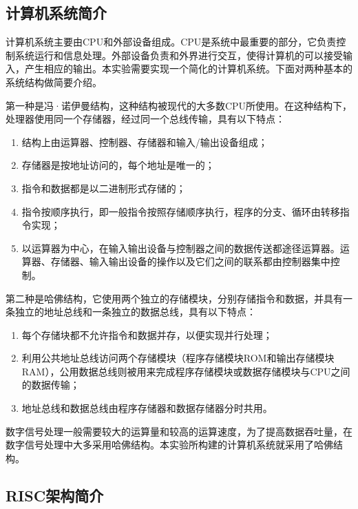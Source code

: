 \documentclass[titlepage, 11pt]{article}
\begin{document}
	\subsection{计算机系统简介}
	计算机系统主要由CPU和外部设备组成。CPU是系统中最重要的部分，它负责控制系统运行和信息处理。外部设备负责和外界进行交互，使得计算机的可以接受输入，产生相应的输出。本实验需要实现一个简化的计算机系统。下面对两种基本的系统结构做简要介绍。\par 
	第一种是冯·诺伊曼结构，这种结构被现代的大多数CPU所使用。在这种结构下，处理器使用同一个存储器，经过同一个总线传输，具有以下特点：
	\begin{enumerate}
		\item 结构上由运算器、控制器、存储器和输入/输出设备组成；
		\item 存储器是按地址访问的，每个地址是唯一的；
		\item 指令和数据都是以二进制形式存储的；
		\item 指令按顺序执行，即一般指令按照存储顺序执行，程序的分支、循环由转移指令实现；
		\item 以运算器为中心，在输入输出设备与控制器之间的数据传送都途径运算器。运算器、存储器、输入输出设备的操作以及它们之间的联系都由控制器集中控制。
	\end{enumerate}\par 
	第二种是哈佛结构，它使用两个独立的存储模块，分别存储指令和数据，并具有一条独立的地址总线和一条独立的数据总线，具有以下特点：
	\begin{enumerate}
		\item 每个存储块都不允许指令和数据并存，以便实现并行处理；
		\item 利用公共地址总线访问两个存储模块（程序存储模块ROM和输出存储模块RAM），公用数据总线则被用来完成程序存储模块或数据存储模块与CPU之间的数据传输；
		\item 地址总线和数据总线由程序存储器和数据存储器分时共用。
	\end{enumerate}\par 
	数字信号处理一般需要较大的运算量和较高的运算速度，为了提高数据吞吐量，在数字信号处理中大多采用哈佛结构。本实验所构建的计算机系统就采用了哈佛结构。
	\subsection{RISC架构简介}
\end{document}
